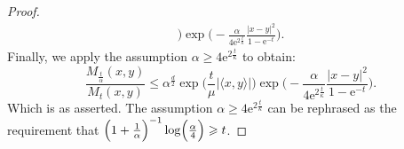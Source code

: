 \documentclass[a4paper,oneside,10pt]{amsproc}
\theoremstyle{remark}
\newcommand{\la}{\langle}
\newcommand{\ra}{\rangle}
\renewcommand{\leq}{\leqslant}
\renewcommand{\leq}{\leqslant}
\renewcommand{\geq}{\geqslant}
\newcommand{\e}{\mathrm{e}} %
\renewcommand{\leq}{\leqslant}%
\renewcommand{\geq}{\geqslant}%
\begin{document}
\begin{proof}
\begin{align*}
    \biggr ) \exp \biggl (-\frac{\alpha}{4\e^{2 \frac{t}{\kappa}}} \frac{|x - y|^2}{1
      - \e^{-t}} \biggr). 
  \end{align*}
  Finally, we apply the assumption $\alpha \geq 4 \e^{2
    \frac{t}{\kappa}}$ to obtain: 
  \begin{equation*}
    \frac{M_{\frac{t}{\alpha}}(x, y)}{M_t(x, y)} \leq \alpha^{\frac{d}2}
   \exp\biggl (\frac{t}{\mu} |\la x, y \ra| \biggr)
   \exp\biggl(-\frac{\alpha}{4\e^{2 \frac{t}{\kappa}}} \frac{|x - y|^2}{1 - \e^{-t}}
   \biggr). 
 \end{equation*}
  Which is as asserted. The assumption $\alpha \geq 4 \e^{2
    \frac{t}{\kappa}}$ can be rephrased as the requirement that
  $\Bigl(1 + \frac1\alpha \Bigr)^{-1} \log\Bigl( \frac\alpha4 \Bigr) \geq t$.
\end{proof}
 
\end{document}
